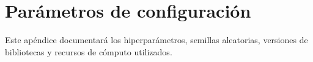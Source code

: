 \chapter{Parámetros de configuración}

Este apéndice documentará los hiperparámetros, semillas aleatorias, versiones de bibliotecas y recursos de cómputo utilizados.
